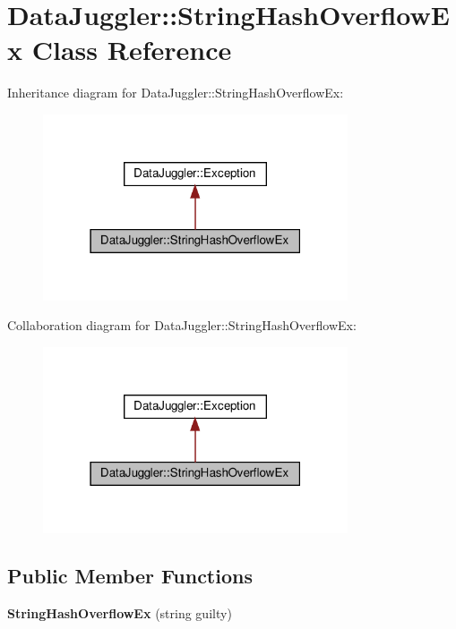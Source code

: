 \hypertarget{classDataJuggler_1_1StringHashOverflowEx}{}\section{Data\+Juggler\+:\+:String\+Hash\+Overflow\+Ex Class Reference}
\label{classDataJuggler_1_1StringHashOverflowEx}


Inheritance diagram for Data\+Juggler\+:\+:String\+Hash\+Overflow\+Ex\+:\nopagebreak
\begin{figure}[H]
\begin{center}
\leavevmode
\includegraphics[width=255pt]{classDataJuggler_1_1StringHashOverflowEx__inherit__graph}
\end{center}
\end{figure}


Collaboration diagram for Data\+Juggler\+:\+:String\+Hash\+Overflow\+Ex\+:\nopagebreak
\begin{figure}[H]
\begin{center}
\leavevmode
\includegraphics[width=255pt]{classDataJuggler_1_1StringHashOverflowEx__coll__graph}
\end{center}
\end{figure}
\subsection*{Public Member Functions}
\begin{DoxyCompactItemize}
\item 
\mbox{\label{classDataJuggler_1_1StringHashOverflowEx_a1b015bde7404e9de2b790d3ced167488}} 
{\bfseries String\+Hash\+Overflow\+Ex} (string guilty)
\end{DoxyCompactItemize}
